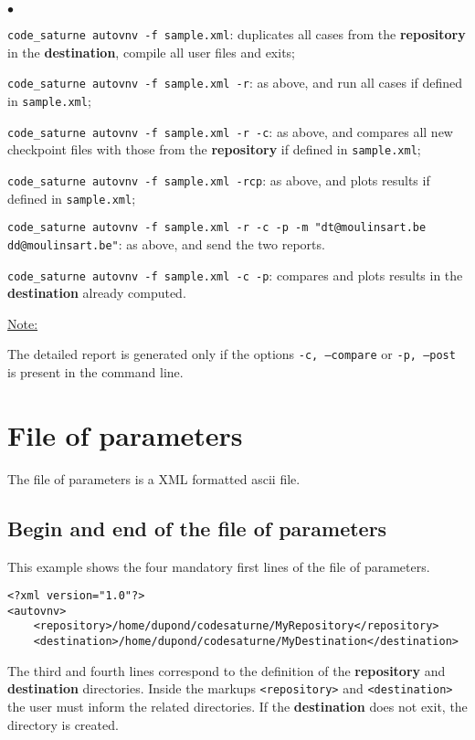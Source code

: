 \documentclass[a4paper,10pt,twoside]{csshortdoc}
\begin{document}
\begin{list}{$\bullet$}{}
\item \texttt{code\_saturne autovnv -f sample.xml}: duplicates all cases from
the \textbf{repository} in the \textbf{destination}, compile all user files
and exits;
\item \texttt{code\_saturne autovnv -f sample.xml -r}: as above, and run all
cases if defined in \texttt{sample.xml};
\item \texttt{code\_saturne autovnv -f sample.xml -r -c}: as above, and compares
all new checkpoint files with those from the \textbf{repository} if defined
in \texttt{sample.xml};
\item \texttt{code\_saturne autovnv -f sample.xml -rcp}: as above, and plots
results if defined in \texttt{sample.xml};
\item \texttt{code\_saturne autovnv -f sample.xml -r -c -p -m
"dt@moulinsart.be dd@moulinsart.be"}: as above, and send the two
reports.
\item \texttt{code\_saturne autovnv -f sample.xml -c -p}: compares and plots
results in the \textbf{destination} already computed.
\end{list}

\underline{Note:}

The detailed report is generated only if the options \texttt{-c, --compare}
or \texttt{-p, --post} is present in the command line.

\section{File of parameters}

The file of parameters is a XML formatted ascii file.

\subsection{Begin and end of the file of parameters}

This example shows the four mandatory first lines of the file of parameters.

\small
\begin{verbatim}
<?xml version="1.0"?>
<autovnv>
    <repository>/home/dupond/codesaturne/MyRepository</repository>
    <destination>/home/dupond/codesaturne/MyDestination</destination>
\end{verbatim}
\normalsize

The third and fourth lines correspond to the definition of the
\textbf{repository} and \textbf{destination} directories.
Inside the markups \texttt{<repository>} and \texttt{<destination>} the user
must inform the related directories. If the \textbf{destination} does not exit,
the directory is created.
\end{document}
